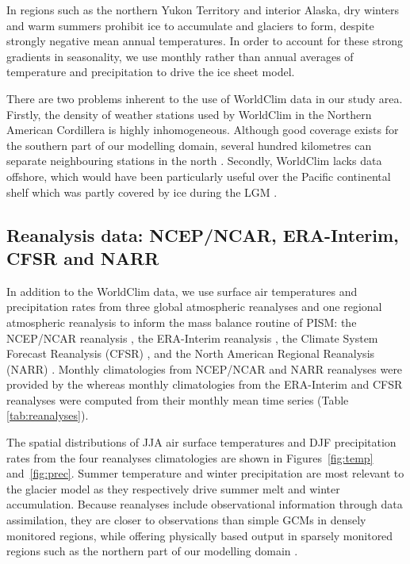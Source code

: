 In regions such as the northern Yukon Territory and interior Alaska, dry winters and warm summers prohibit ice to accumulate and glaciers to form, despite strongly negative mean annual temperatures. In order to account for these strong gradients in seasonality, we use monthly rather than annual averages of temperature and precipitation to drive the ice sheet model.

There are two problems inherent to the use of WorldClim data in our study area. Firstly, the density of weather stations used by WorldClim in the Northern American Cordillera is highly inhomogeneous. Although good coverage exists for the southern part of our modelling domain, several hundred kilometres can separate neighbouring stations in the north \citep{data:worldclim}. Secondly, WorldClim lacks data offshore, which would have been particularly useful over the Pacific continental shelf which was partly covered by ice during the LGM \citep{jackson-clague-1991}.


\subsection{Reanalysis data: NCEP/NCAR, ERA-Interim, CFSR and NARR}

In addition to the WorldClim data, we use surface air temperatures and precipitation rates from three global atmospheric reanalyses and one regional atmospheric reanalysis to inform the mass balance routine of PISM: the NCEP/NCAR reanalysis \citep{data:ncar}, the ERA-Interim reanalysis \citep{data:erai}, the Climate System Forecast Reanalysis (CFSR) \citep{data:cfsr}, and the North American Regional Reanalysis (NARR) \citep{data:narr}. Monthly climatologies from NCEP/NCAR and NARR reanalyses were provided by the \citet{web:psd} whereas monthly climatologies from the ERA-Interim and CFSR reanalyses were computed from their monthly mean time series (Table \ref{tab:reanalyses}).

The spatial distributions of JJA air surface temperatures and DJF precipitation rates from the four reanalyses climatologies are shown in Figures~\ref{fig:temp} and~\ref{fig:prec}. Summer temperature and winter precipitation are most relevant to the glacier model as they respectively drive summer melt and winter accumulation. Because reanalyses include observational information through data assimilation, they are closer to observations than simple GCMs in densely monitored regions, while offering physically based output in sparsely monitored regions such as the northern part of our modelling domain \citep{bengtsson-etal-2007}.

